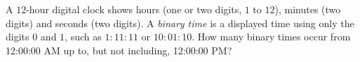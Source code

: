 A $12$-hour digital clock shows hours (one or two digits, $1$ to $12$), minutes (two digits) and seconds (two digits). A \emph{binary time} is a displayed time using only the digits $0$ and $1$, such as $1\!:\!11\!:\!11$ or $10\!:\!01\!:\!10$. How many binary times occur from 12:00:00 AM up to, but not including, 12:00:00 PM?
